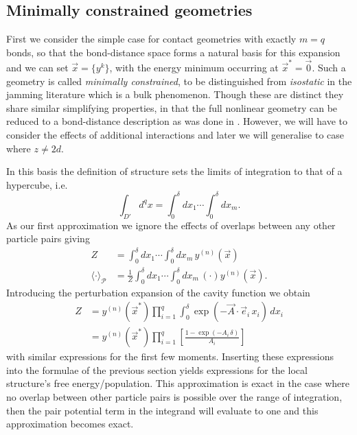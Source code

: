 \documentclass[11pt,twoside]{report}
\begin{document}
\subsection{Minimally constrained geometries}

First we consider the simple case for contact geometries with exactly $m=q$ bonds, so that the bond-distance space forms a natural basis for this expansion and we can set $\vec{x} = \{y^k\}$, with the energy minimum occurring at $\vec{x}^* = \vec{0}$.
Such a geometry is called \emph{minimally constrained}, to be distinguished from \emph{isostatic} in the jamming literature which is a bulk phenomenon.
Though these are distinct they share similar simplifying properties, in that the full nonlinear geometry can be reduced to a bond-distance description as was done in \cite{Wyart}.
However, we will have to consider the effects of additional interactions and later we will generalise to case where $z \ne 2d$.

In this basis the definition of structure sets the limits of integration to that of a hypercube, i.e.\
\begin{equation*}
  \int_{D'} d^q x
  =
  \int_0^\delta dx_1 \cdots \int_0^\delta dx_m.
\end{equation*}
As our first approximation we ignore the effects of overlaps between any other particle pairs giving
\begin{subequations}
  \begin{align}
    Z
    &=
    \int_0^\delta dx_1 \cdots \int_0^\delta dx_m
    \, y^{(n)}(\vec{x})
    \\
    \langle \cdot \rangle_\mathcal{P}
    &=
    \frac{1}{Z}
    \int_0^\delta dx_1 \cdots \int_0^\delta dx_m
    \, (\cdot) y^{(n)}(\vec{x}).
  \end{align}
\end{subequations}
Introducing the perturbation expansion of the cavity function we obtain
\begin{equation}
  \begin{split}
    Z
    &=
    y^{(n)}(\vec{x}^*)
    \prod_{i=1}^q
    \int_0^\delta
    \exp{\left( -\vec{A} \cdot \vec{e}_i \, x_i \right)}
    \, dx_i
    \\ &=
    y^{(n)}(\vec{x}^*)
    \prod_{i=1}^q
    \left[
    \frac{1 - \exp{\left( -A_i \, \delta \right)}}{A_i}
    \right]
  \end{split}
\end{equation}
with similar expressions for the first few moments.
Inserting these expressions into the formulae of the previous section yields expressions for the local structure's free energy/population.
This approximation is exact in the case where no overlap between other particle pairs is possible over the range of integration, then the pair potential term in the integrand will evaluate to one and this approximation becomes exact.
\end{document}
